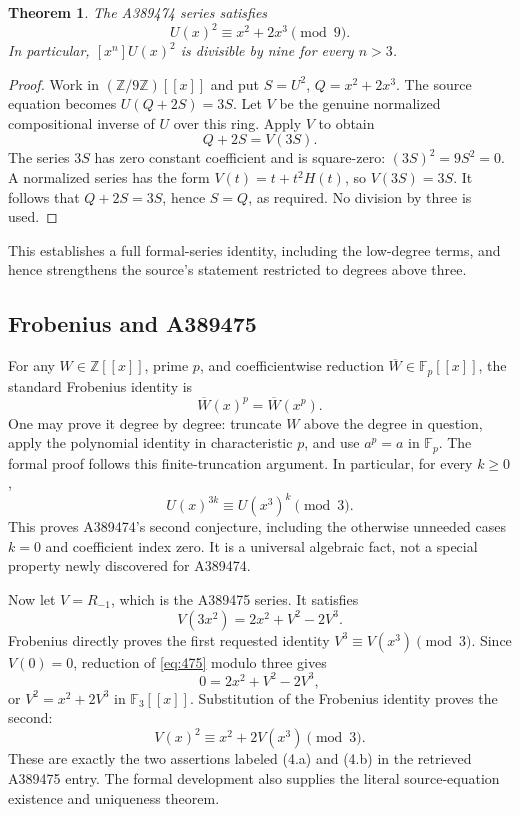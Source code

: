 \documentclass[11pt,a4paper]{article}
\newtheorem{theorem}{Theorem}[section]
\theoremstyle{remark}
\newcommand{\Z}{\mathbb Z}
\newcommand{\F}{\mathbb F}
\newcommand{\ps}[1]{#1[[x]]}
\begin{document}
\begin{theorem}\label{thm:modnine}
The A389474 series satisfies
\[
U(x)^2\equiv x^2+2x^3\pmod9.
\]
In particular, $[x^n]U(x)^2$ is divisible by nine for every $n>3$.
\end{theorem}

\begin{proof}
Work in $(\Z/9\Z)[[x]]$ and put $S=U^2$, $Q=x^2+2x^3$.
The source equation becomes $U(Q+2S)=3S$. Let $V$ be the genuine
normalized compositional inverse of $U$ over this ring. Apply $V$ to
obtain
\[
Q+2S=V(3S).
\]
The series $3S$ has zero constant coefficient and is square-zero:
$(3S)^2=9S^2=0$. A normalized series has the form
$V(t)=t+t^2H(t)$, so $V(3S)=3S$. It follows that $Q+2S=3S$, hence
$S=Q$, as required. No division by three is used.
\end{proof}

This establishes a full formal-series identity, including the low-degree
terms, and hence strengthens the source's statement restricted to
degrees above three.

\subsection{Frobenius and A389475}

For any $W\in\ps{\Z}$, prime $p$, and coefficientwise reduction
$\overline W\in\ps{\F_p}$, the standard Frobenius identity is
\begin{equation}\label{eq:frobenius}
\overline W(x)^p=\overline W(x^p).
\end{equation}
One may prove it degree by degree: truncate $W$ above the degree in
question, apply the polynomial identity in characteristic $p$, and
use $a^p=a$ in $\F_p$. The formal proof follows this finite-truncation
argument. In particular, for every $k\ge0$,
\[
U(x)^{3k}\equiv U(x^3)^k\pmod3.
\]
This proves A389474's second conjecture, including the otherwise
unneeded cases $k=0$ and coefficient index zero. It is a universal
algebraic fact, not a special property newly discovered for A389474.

Now let $V=R_{-1}$, which is the A389475 series. It satisfies
\begin{equation}\label{eq:475}
V(3x^2)=2x^2+V^2-2V^3.
\end{equation}
Frobenius directly proves the first requested identity
$V^3\equiv V(x^3)\pmod3$. Since $V(0)=0$, reduction of
\eqref{eq:475} modulo three gives
\[
0=2x^2+V^2-2V^3,
\]
or $V^2=x^2+2V^3$ in $\ps{\F_3}$. Substitution of the Frobenius
identity proves the second:
\begin{equation}\label{eq:475square}
V(x)^2\equiv x^2+2V(x^3)\pmod3.
\end{equation}
These are exactly the two assertions labeled (4.a) and (4.b) in the
retrieved A389475 entry. The formal development also supplies the
literal source-equation existence and uniqueness theorem.
\end{document}

